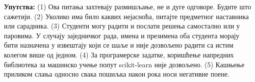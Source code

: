 {\bf Упутства:} (1) Ова питања захтевају размишљање, не и дуге одговоре. Будите што сажетији. (2) Уколико има било каквих нејасноћа, питајте предметног наставника или сарадника. (3) Студенти могу радити и послати решења самостално или у паровима. У случају заједничког рада, имена и презимена оба студента морају бити назначена у извештају који се шаље и није дозвољено радити са истим колегом више од једном. (4) За програмерске задатке, коришћење напредних библиотека за машинско учење попут scikit-learn није дозвољено. (5) Кашњење приликом слања односно свака пошиљка након рока носи негативне поене.

